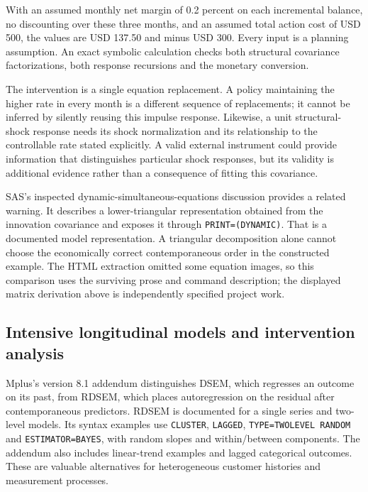 With an assumed monthly net margin of 0.2 percent on each incremental
balance, no discounting over these three months, and an assumed total
action cost of USD 500, the values are USD 137.50 and minus USD 300.
Every input is a planning assumption. An exact symbolic calculation
checks both structural covariance factorizations, both response
recursions and the monetary conversion.~\citep{exec13_ct_examples}

The intervention is a single equation replacement. A policy maintaining
the higher rate in every month is a different sequence of replacements;
it cannot be inferred by silently reusing this impulse response.
Likewise, a unit structural-shock response needs its shock normalization
and its relationship to the controllable rate stated explicitly. A valid
external instrument could provide information that distinguishes
particular shock responses, but its validity is additional evidence
rather than a consequence of fitting this covariance.

SAS's inspected dynamic-simultaneous-equations discussion provides a
related warning. It describes a lower-triangular representation obtained
from the innovation covariance and exposes it through
\texttt{PRINT=(DYNAMIC)}. That is a documented model representation. A
triangular decomposition alone cannot choose the economically correct
contemporaneous order in the constructed example. The HTML extraction
omitted some equation images, so this comparison uses the surviving
prose and command description; the displayed matrix derivation above is
independently specified project work.
\citep{exec13_ct_sas_structural,exec13_ct_examples}

\hypertarget{intensive-longitudinal-models-and-intervention-analysis}{%
\subsection{Intensive longitudinal models and intervention
analysis}\label{intensive-longitudinal-models-and-intervention-analysis}}

Mplus's version 8.1 addendum distinguishes DSEM, which regresses an
outcome on its past, from RDSEM, which places autoregression on the
residual after contemporaneous predictors. RDSEM is documented for a
single series and two-level models. Its syntax examples use
\texttt{CLUSTER}, \texttt{LAGGED}, \texttt{TYPE=TWOLEVEL\ RANDOM} and
\texttt{ESTIMATOR=BAYES}, with random slopes and within/between
components. The addendum also includes linear-trend examples and lagged
categorical outcomes. These are valuable alternatives for heterogeneous
customer histories and measurement processes. \citep{exec13_ct_mplus81}


